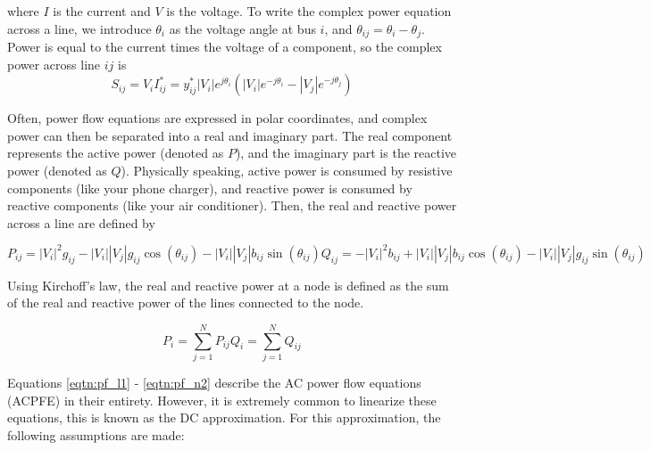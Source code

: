 where $I$ is the current and $V$ is the voltage.  To write the complex power equation across a line, we introduce $\theta_i$ as the voltage angle at bus $i$, and $\theta_{ij} = \theta_i - \theta_j$.  Power is equal to the current times the voltage of a component, so the complex power across line $ij$ is
\begin{equation}
	\label{eqtn:complex_power}
	S_{ij} = V_iI^*_{ij} = y^*_{ij} |V_i|e^{j\theta_i}(|V_i|e^{-j\theta_i}-|V_j|e^{-j\theta_j})
\end{equation}

Often, power flow equations are expressed in polar coordinates, and complex power can then be separated into a real and imaginary part.  The real component represents the active power (denoted as $P$), and the imaginary part is the reactive power (denoted as $Q$).  Physically speaking, active power is consumed by resistive components (like your phone charger), and reactive power is consumed by reactive components (like your air conditioner).  Then, the real and reactive power across a line are defined by

\begin{subequations}
\label{eqtn:pf_line}
\begin{equation}
  P_{ij} = |V_i|^2 g_{ij} - |V_i| |V_j| g_{ij} \cos(\theta_{ij})-|V_i| |V_j| b_{ij}\sin(\theta_{ij})
    \label{eqtn:pf_l1}
\end{equation}    
\begin{equation}
 Q_{ij} = -|V_i|^2 b_{ij} +|V_i||V_j| b_{ij} \cos(\theta_{ij})-|V_i||V_j|g_{ij}\sin(\theta_{ij})
 \label{eqtn:pf_l2}
\end{equation}
\end{subequations}

Using Kirchoff's law, the real and reactive power at a node is defined as the sum of the real and reactive power of the lines connected to the node.

\begin{subequations}
\label{eqtn:pf_node}
\begin{equation}
  P_{i} = \sum_{j=1}^N P_{ij}
    \label{eqtn:pf_n1}
\end{equation}    
\begin{equation}
 Q_{i} = \sum_{j=1}^N Q_{ij}
 \label{eqtn:pf_n2}
\end{equation}
\end{subequations}


Equations \ref{eqtn:pf_l1} - \ref{eqtn:pf_n2} describe the AC power flow equations (ACPFE) in their entirety.  However, it is extremely common to linearize these equations, this is known as the DC approximation.  For this approximation, the following assumptions are made:

